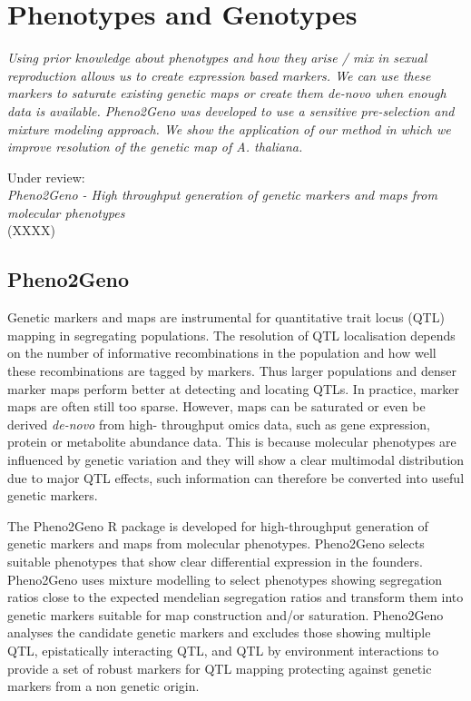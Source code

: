 \chapter{Phenotypes and Genotypes}

\emph{Using prior knowledge about phenotypes and how they arise / mix in sexual 
reproduction allows us to create expression based markers. We can use these markers
to saturate existing genetic maps or create them de-novo when enough data is 
available. Pheno2Geno was developed to use a sensitive pre-selection and mixture 
modeling approach. We show the application of our method in which we improve 
resolution of the genetic map of A. thaliana.}

\null
\vfill

\begin{myexampleblock}{Under review:}
  \\
  \emph{Pheno2Geno - High throughput generation of genetic markers and maps from molecular phenotypes}\\
   (XXXX)
\end{myexampleblock}
\newpage

\section{Pheno2Geno}
Genetic markers and maps are instrumental for quantitative trait locus (QTL) mapping in segregating 
populations. The resolution of QTL localisation depends on the number of informative recombinations 
in the population and how well these recombinations are tagged by markers. Thus larger populations 
and denser marker maps perform better at detecting and locating QTLs. In practice, marker maps are 
often still too sparse. However, maps can be saturated or even be derived \emph{de-novo} from high-
throughput omics data, such as gene expression, protein or metabolite abundance data. This is because 
molecular phenotypes are influenced by genetic variation and they will show a clear multimodal 
distribution due to major QTL effects, such information can therefore be converted into useful 
genetic markers.

The Pheno2Geno R package is developed for high-throughput generation of genetic markers and maps from 
molecular phenotypes. Pheno2Geno selects suitable phenotypes that show clear differential expression 
in the founders. Pheno2Geno uses mixture modelling to select phenotypes showing segregation ratios 
close to the expected mendelian segregation ratios and transform them into genetic markers suitable 
for map construction and/or saturation. Pheno2Geno analyses the candidate genetic markers and excludes 
those showing multiple QTL, epistatically interacting QTL, and QTL by environment interactions to 
provide a set of robust markers for QTL mapping protecting against genetic markers from a non genetic 
origin.

